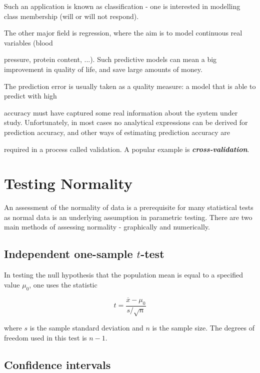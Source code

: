 

Such an application is known as classification - one is interested in modelling class membership (will or will not respond).

 

The other major field is regression, where the aim is to model continuous real variables (blood

pressure, protein content, ...). Such predictive models can mean a big improvement in quality of life, and save large amounts of money.

 

The prediction error is usually taken as a quality measure: a model that is able to predict with high

accuracy must have captured some real information about the system under study. Unfortunately, in most cases no analytical expressions can be derived for prediction accuracy, and other ways of estimating prediction accuracy are

required in a process called validation. A popular example is \textbf{\emph{cross-validation}}.

 

\section{Testing Normality}

An assessment of the normality of data is a prerequisite for many statistical tests as normal data is an underlying assumption in parametric testing. There are two main methods of assessing normality - graphically and numerically.

 







\subsection{Independent one-sample $t$-test}

In testing the null hypothesis that the population mean is equal to a specified value $\mu_{0}$, one uses the statistic

 

\begin{equation}t = \frac{\overline{x} - \mu_0}{s / \sqrt{n}}\end{equation}

 

where $s$ is the sample standard deviation and $n$ is the sample size. The degrees of freedom used in this test is $n - 1$.\subsection{Confidence intervals}

